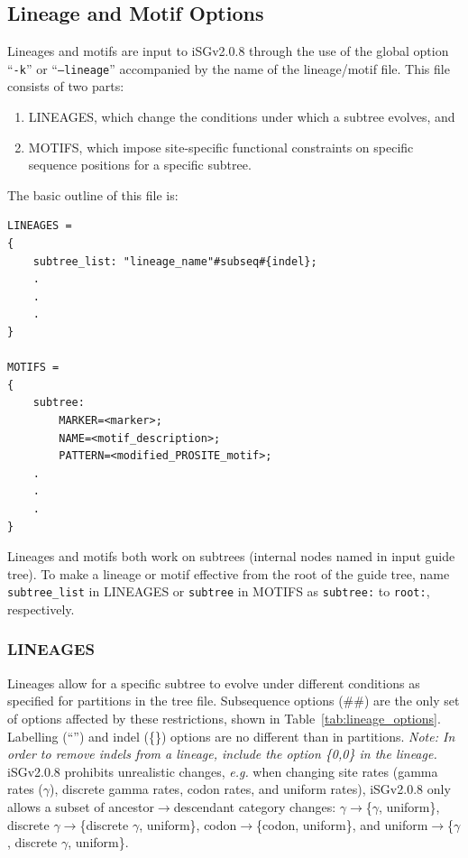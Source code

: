 \documentclass[10pt]{article}
\newcommand{\version}{2.0.8 }
\newcommand{\iSGcurrentshort}{iSGv\version }
\begin{document}
 \subsection{Lineage and Motif Options}
 \label{sec:lineage}
 \label{sec:lineage_options}
 \label{sec:motif_options}
 Lineages and motifs are input to \iSGcurrentshort through the use of the global option ``{\tt -k}'' or ``{\tt --lineage}'' accompanied by the name of the lineage/motif file. This file consists of two parts:
  \begin{enumerate}
   \item LINEAGES, which change the conditions under which a subtree evolves, and
   \item MOTIFS, which impose site-specific functional constraints on specific sequence positions for a specific subtree.
  \end{enumerate}

The basic outline of this file is:
\begin{verbatim}
LINEAGES =
{
    subtree_list: "lineage_name"#subseq#{indel};
    .
    .
    .
}

MOTIFS =
{
    subtree:
        MARKER=<marker>;
        NAME=<motif_description>;
        PATTERN=<modified_PROSITE_motif>;
    .
    .
    .
}
\end{verbatim}

Lineages and motifs both work on subtrees (internal nodes named in input guide tree). To make a lineage or motif effective from the root of the guide tree, name {\tt subtree\_list} in LINEAGES or {\tt subtree} in MOTIFS as {\tt subtree:} to {\tt root:}, respectively.


 \subsubsection{LINEAGES}
 Lineages allow for a specific subtree to evolve under different conditions as specified for partitions in the tree file.  Subsequence options (\#\#) are the only set of options affected by these restrictions, shown in Table~\ref{tab:lineage_options}. Labelling (``'') and indel (\{\}) options are no different than in partitions. {\it Note: In order to remove indels from a lineage, include the option \{0,0\} in the lineage.}
 \iSGcurrentshort prohibits unrealistic changes, {\it e.g.} when changing site rates (gamma rates ($\gamma$), discrete gamma rates, codon rates, and uniform rates), \iSGcurrentshort only allows a subset of ancestor$\rightarrow$descendant category changes: $\gamma\rightarrow$\{$\gamma$, uniform\}, discrete $\gamma\rightarrow$\{discrete $\gamma$, uniform\}, codon$\rightarrow$\{codon, uniform\}, and uniform$\rightarrow$\{$\gamma$, discrete $\gamma$, uniform\}.
\end{document}
